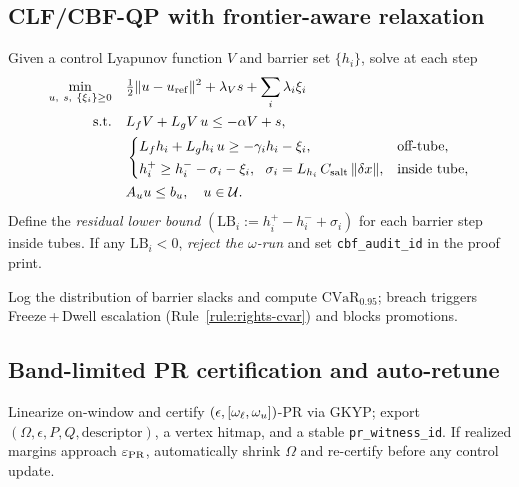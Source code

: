 \subsection{CLF/CBF-QP with frontier-aware relaxation}\label{subsec:clf-cbf-qp}
\emph{}

\begin{lemma}\label{lem:qp}
Given a control Lyapunov function $V$ and barrier set $\{h_i\}$, solve at each step
\[
\begin{aligned}
\min_{u,\ s,\ \{\xi_i\}\ge 0}\quad
& \tfrac{1}{2}\|u-u_{\mathrm{ref}}\|^2 + \lambda_V s + \sum_i \lambda_i \xi_i \\
\text{s.t.}\quad
& L_f V + L_g V\,u \le -\alpha V + s,\\
& \begin{cases}
L_f h_i + L_g h_i\,u \ge -\gamma_i h_i - \xi_i,& \text{off-tube},\\[2pt]
h_i^+ \ge h_i^- - \sigma_i - \xi_i,\ \ \sigma_i=L_{h_i}\,\constsymsalt\,\|\delta x\|,& \text{inside tube},
\end{cases}\\
& A_u u \le b_u,\quad u\in\mathcal U.
\end{aligned}
\]
Define the \emph{residual lower bound}
$(
\mathrm{LB}_i:=h_i^+-h_i^-+\sigma_i
)$
for each barrier step inside tubes. If any $\mathrm{LB}_i<0$, \emph{reject the $\omega$-run} and set \texttt{cbf\_audit\_id} in the proof print.
\end{lemma}

\begin{remark}\label{rem:cvar}
Log the distribution of barrier slacks and compute $\mathrm{CVaR}_{0.95}$; breach triggers Freeze\,+\,Dwell escalation (Rule~\ref{rule:rights-cvar}) and blocks promotions.
\end{remark}

\subsection{Band-limited PR certification and auto-retune}\label{subsec:pr-cert}
\emph{}

Linearize on-window and certify $(\epsilon,[\omega_{\ell},\omega_{u}])$-PR via GKYP; export $(\Omega,\epsilon,P,Q,\text{descriptor})$, a vertex hitmap, and a stable \texttt{pr\_witness\_id}. If realized margins approach $\varepsilon_{\mathrm{PR}}$, automatically shrink $\Omega$ and re-certify before any control update.

